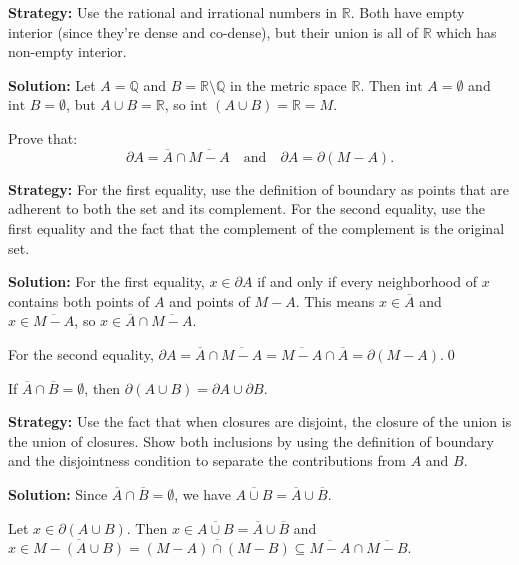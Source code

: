 \noindent\textbf{Strategy:} Use the rational and irrational numbers in $\mathbb{R}$. Both have empty interior (since they're dense and co-dense), but their union is all of $\mathbb{R}$ which has non-empty interior.

\bigskip\noindent\textbf{Solution:} Let $A = \mathbb{Q}$ and $B = \mathbb{R} \setminus \mathbb{Q}$ in the metric space $\mathbb{R}$. Then $\text{int } A = \emptyset$ and $\text{int } B = \emptyset$, but $A \cup B = \mathbb{R}$, so $\text{int } (A \cup B) = \mathbb{R} = M$.



\begin{problembox}
Prove that:
\[
\partial A = \overline{A} \cap \overline{M - A} \quad \text{and} \quad \partial A = \partial(M - A).
\]
\end{problembox}

\noindent\textbf{Strategy:} For the first equality, use the definition of boundary as points that are adherent to both the set and its complement. For the second equality, use the first equality and the fact that the complement of the complement is the original set.

\bigskip\noindent\textbf{Solution:} For the first equality, $x \in \partial A$ if and only if every neighborhood of $x$ contains both points of $A$ and points of $M - A$. This means $x \in \overline{A}$ and $x \in \overline{M - A}$, so $x \in \overline{A} \cap \overline{M - A}$.

For the second equality, $\partial A = \overline{A} \cap \overline{M - A} = \overline{M - A} \cap \overline{A} = \partial(M - A)$.\qed


\begin{problembox}
If \(\overline{A} \cap \overline{B} = \emptyset\), then \(\partial(A \cup B) = \partial A \cup \partial B\).
\end{problembox}

\noindent\textbf{Strategy:} Use the fact that when closures are disjoint, the closure of the union is the union of closures. Show both inclusions by using the definition of boundary and the disjointness condition to separate the contributions from $A$ and $B$.

\bigskip\noindent\textbf{Solution:} Since $\overline{A} \cap \overline{B} = \emptyset$, we have $\overline{A \cup B} = \overline{A} \cup \overline{B}$.

Let $x \in \partial(A \cup B)$. Then $x \in \overline{A \cup B} = \overline{A} \cup \overline{B}$ and $x \in \overline{M - (A \cup B)} = \overline{(M - A) \cap (M - B)} \subseteq \overline{M - A} \cap \overline{M - B}$.

